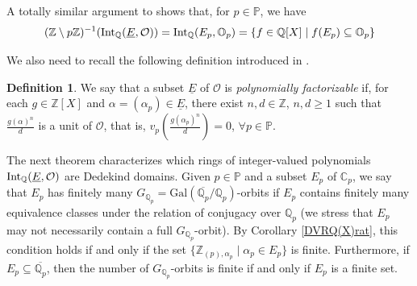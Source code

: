 \documentclass[10pt]{article}
\numberwithin{equation}{section}
\theoremstyle{definition}\newtheorem{Def}[equation]{Definition}
\theoremstyle{definition}\newtheorem{Ques}[equation]{Question}
\newcommand{\Q}{\mathbb{Q}}
\newcommand{\Z}{\mathbb{Z}}
\renewcommand{\O}{\mathbb{O}}
\newcommand{\C}{\mathbb{C}}
\newcommand{\PP}{\mathbb{P}}
\newcommand{\Int}{\textnormal{Int}}
\newcommand{\IntQ}{\Int_{\Q}}
\newcommand{\uE}{\underline{E}}
\newcommand{\oQp}{\overline{\Q_p}}
\newcommand{\Gal}{\text{Gal}}
\begin{document}
A totally similar argument to \cite[Lemma 2.5]{PerDedekind} shows that, for $p\in\PP$, we have
$$(\Z\setminus p\Z)^{-1}(\IntQ(\uE,\mathcal O))=\IntQ(E_p,\O_p)=\{f\in\Q[X]\mid f(E_p)\subseteq \O_p\}$$

We also need to recall the following definition introduced in \cite{PerDedekind}.

\begin{Def}
We say that a subset $\uE$  of $\mathcal O$ is \emph{polynomially factorizable} if, for each $g\in\Z[X]$ and $\alpha=(\alpha_p)\in\uE$, there exist $n,d\in\Z$, $n,d\geq 1$ such that $\frac{g(\alpha)^n}{d}$ is a unit of $\mathcal O$, that is, $v_p(\frac{g(\alpha_p)^n}{d})=0$, $\forall p\in\PP$.
\end{Def}

The next theorem characterizes which rings of integer-valued polynomials $\IntQ(\uE,\mathcal{O})$ are Dedekind domains. Given   $p\in\PP$ and a subset $E_p$ of $\C_p$, we say that $E_p$ has finitely many $G_{\Q_p}=\Gal(\oQp/\Q_p)$-orbits if $E_p$ contains finitely many equivalence classes under the  relation of conjugacy over $\Q_p$ (we stress that $E_p$ may not necessarily contain a full $G_{\Q_p}$-orbit). By Corollary \ref{DVRQ(X)rat}, this condition holds  if and only if the set $\{\Z_{(p),\alpha_p}\mid \alpha_p\in E_p\}$ is finite.
Furthermore, if $E_p\subseteq\oQp$, then the number of $G_{\Q_p}$-orbits  is finite if and only if $E_p$ is a finite set. 
\end{document}
